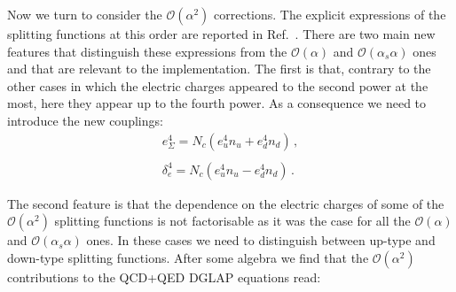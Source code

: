 \begin{widetext}
Now we turn to consider the $\mathcal{O}(\alpha^2)$ corrections. The
explicit expressions of the splitting functions at this order are
reported in Ref.~\cite{deFlorian:2016gvk}. There are two main new
features that distinguish these expressions from the
$\mathcal{O}(\alpha)$ and $\mathcal{O}(\alpha_s\alpha)$ ones and that
are relevant to the implementation. The first is that, contrary to the
other cases in which the electric charges appeared to the second power
at the most, here they appear up to the fourth power. As a consequence
we need to introduce the new couplings:
\begin{equation}
\begin{array}{l}
e_{\Sigma}^4 = N_c(e_u^4 n_{u} + e_d^4
  n_{d})\,,\\
\\\delta_e^4 = N_c(e_u^4 n_{u} - e_d^4
  n_{d})\,.
\end{array}
\end{equation}

The second feature is that the dependence on the electric charges of
some of the $\mathcal{O}(\alpha^2)$ splitting functions is not
factorisable as it was the case for all the $\mathcal{O}(\alpha)$ and
$\mathcal{O}(\alpha_s\alpha)$ ones. In these cases we need to
distinguish between up-type and down-type splitting functions. After
some algebra we find that the $\mathcal{O}(\alpha^2)$ contributions to
the QCD+QED DGLAP equations read:


\end{widetext}
